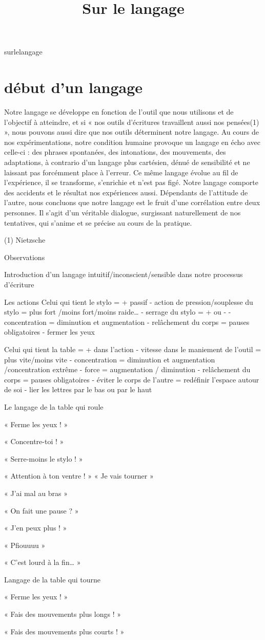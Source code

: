 \product surlelangage
\title {Sur le langage}
	\startext
		\part {début d'un langage}
		
Notre langage se développe en fonction de l'outil que nous utilisons et de l'objectif à atteindre, et si « nos outils d'écritures travaillent aussi nos pensées(1) », nous pouvons aussi dire que nos outils déterminent notre langage. Au cours de nos expérimentations, notre condition humaine provoque un langage en écho avec celle-ci : des phrases spontanées, des intonations, des mouvements, des adaptations, à contrario d'un langage plus cartésien, dénué de sensibilité et ne laissant pas forcémment place à l'erreur. Ce même langage évolue au fil de l'expérience, il se transforme, s'enrichie et n'est pas figé. Notre langage comporte des accidents et le résultat nos expériences aussi. Dépendants de l'attitude de l'autre, nous concluons que notre langage est le fruit d'une corrélation entre deux personnes. Il s'agit d'un véritable dialogue, surgissant naturellement de nos tentatives, qui s'anime et se précise au cours de la pratique. 

(1) Nietzsche


Observations

Introduction d'un langage intuitif/inconscient/sensible dans notre processus d'écriture

Les actions
Celui qui tient le stylo = + passif
- action de pression/souplesse du stylo = plus fort /moins fort/moins raide…
- serrage du stylo = + ou -
- concentration = diminution et augmentation 
- relâchement du corps = pauses obligatoires
- fermer les yeux

Celui qui tient la table = + dans l'action
- vitesse dans le maniement de l'outil = plus vite/moins vite
- concentration = diminution et augmentation /concentration extrême
- force = augmentation / diminution
- relâchement du corps = pauses obligatoires
- éviter le corps de l'autre = redéfinir l'espace autour de soi
- lier les lettres par le bas ou par le haut


Le langage de la table qui roule

« Ferme les yeux ! »

« Concentre-toi ! »

« Serre-moins le stylo ! »

« Attention à ton ventre ! » « Je vais tourner »

« J'ai mal au bras »

« On fait une pause ? »

« J'en peux plus ! »

« Pfiouuuu »

« C'est lourd à la fin… »



Langage de la table qui tourne

« Ferme les yeux ! »

« Fais des mouvements plus longs ! »

« Fais des mouvements plus courts ! »

\stoppart
\stoptext
